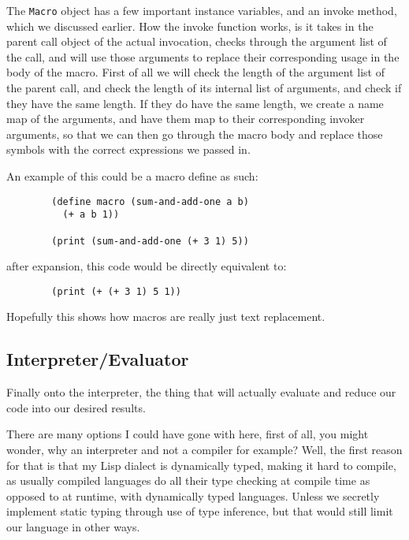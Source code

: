 \documentclass{article}
\newcommand{\code}[1]{\texttt{#1}}
\begin{document}
      The \code{Macro} object has a few important instance variables, and an
      invoke method, which we discussed earlier. How the invoke function works,
      is it takes in the parent call object of the actual invocation, checks through
      the argument list of the call, and will use those arguments to replace their
      corresponding usage in the body of the macro.  First of all we will check
      the length of the argument list of the parent call, and check the length of
      its internal list of arguments, and check if they have the same length.
      If they do have the same length, we create a name map of the arguments, and
      have them map to their corresponding invoker arguments, so that we can then
      go through the macro body and replace those symbols with the correct expressions
      we passed in.

      An example of this could be a macro define as such:

      \begin{verbatim}
        (define macro (sum-and-add-one a b)
          (+ a b 1))

        (print (sum-and-add-one (+ 3 1) 5))
      \end{verbatim}

      after expansion, this code would be directly equivalent to:

      \begin{verbatim}
        (print (+ (+ 3 1) 5 1))
      \end{verbatim}

      Hopefully this shows how macros are really just text replacement.


  \subsection{Interpreter/Evaluator}
    Finally onto the interpreter, the thing that will actually evaluate and
    reduce our code into our desired results.

    There are many options I could have gone with here, first of all, you might
    wonder, why an interpreter and not a compiler for example?  Well, the first
    reason for that is that my Lisp dialect is dynamically typed, making it
    hard to compile, as usually compiled languages do all their type checking at
    compile time as opposed to at runtime, with dynamically typed languages.
    Unless we secretly implement static typing through use of
    type inference, but that would still limit our language in other ways.
\end{document}
